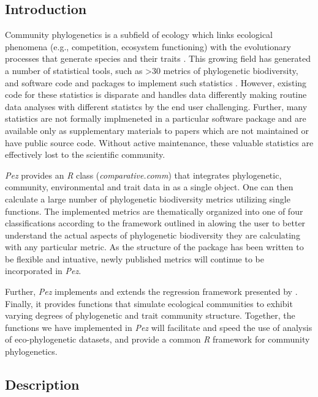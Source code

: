 \documentclass[11pt]{article} %
\begin{document}
\subsection*{Introduction}
Community phylogenetics is a subfield of ecology which links ecological phenomena (e.g., competition, ecosystem functioning)
with the evolutionary processes that generate species and their traits
\autocite[see][]{Webb2002,Cavender-Bares2009}. This growing field has
generated a number of statistical tools, such as >30 metrics of phylogenetic biodiversity, and software code and packages to implement such statistics
\autocite[notably][]{Webb2008,Regetz2009,Kembel2010,Orme2013,Eastman2013}. However, existing code for these statistics is disparate and handles data differently 
making routine data analyses with different statistcs by the end user challenging. Further, many statistics are not formally implmeneted in a particular software package and are available only as supplementary materials to papers which are not
maintained or have public source code. Without active maintenance, these valuable statistics are effectively lost to
the scientific community.

\emph{Pez} provides an \emph{R} class (\emph{comparative.comm}) that
integrates phylogenetic, community, environmental and trait data in as %
a single object. One can then calculate a large number of phylogenetic biodiversity metrics utilizing single functions. The implemented metrics are thematically organized into one of four classifications according to the framework outlined in \textcite{Pearse2014review} alowing the user to better understand the actual aspects of phylogenetic biodiversity they are calculating with any particular metric. As the structure of the package has been written to be flexible and intuative, newly published metrics will continue to be incorporated in \emph{Pez}. 

Further, \emph{Pez} implements and extends the regression framework presented
by \parencite{Cavender-Bares2004} \autocite[see
also][]{Cavender-Bares2006}. Finally, it provides functions that simulate ecological communities to exhibit varying degrees of phylogenetic and trait community structure. Together, the functions we have implemented in \emph{Pez} will facilitate and speed the use of analysis of eco-phylogenetic
datasets, and provide a common \emph{R} framework for community phylogenetics.
\subsection*{Description}
\end{document}
